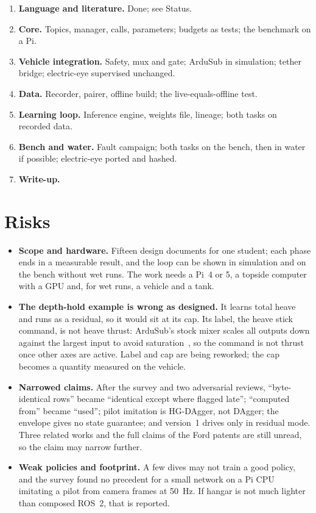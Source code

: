 \documentclass[conference]{IEEEtran}
\begin{document}
\begin{enumerate}
\item \textbf{Language and literature.} Done; see Status.
\item \textbf{Core.} Topics, manager, calls, parameters; budgets as tests;
  the benchmark on a Pi.
\item \textbf{Vehicle integration.} Safety, mux and gate; ArduSub in
  simulation; tether bridge; electric-eye supervised unchanged.
\item \textbf{Data.} Recorder, pairer, offline build; the
  live-equals-offline test.
\item \textbf{Learning loop.} Inference engine, weights file, lineage; both
  tasks on recorded data.
\item \textbf{Bench and water.} Fault campaign; both tasks on the bench,
  then in water if possible; electric-eye ported and hashed.
\item \textbf{Write-up.}
\end{enumerate}

\section{Risks}

\begin{itemize}
\item \textbf{Scope and hardware.} Fifteen design documents for one student;
  each phase ends in a measurable result, and the loop can be shown in
  simulation and on the bench without wet runs. The work needs a Pi~4 or 5, a
  topside computer with a GPU and, for wet runs, a vehicle and a tank.
\item \textbf{The depth-hold example is wrong as designed.} It learns total
  heave and runs as a residual, so it would sit at its cap. Its label, the
  heave stick command, is not heave thrust: ArduSub's stock mixer scales all
  outputs down against the largest input to avoid
  saturation~\cite{ng2024ardusub}, so the command is not thrust once other
  axes are active. Label and cap are being reworked; the cap becomes a
  quantity measured on the vehicle.
\item \textbf{Narrowed claims.} After the survey and two adversarial reviews,
  ``byte-identical rows'' became ``identical except where flagged late'';
  ``computed from'' became ``used''; pilot imitation is HG-DAgger, not DAgger;
  the envelope gives no state guarantee; and version~1 drives only in
  residual mode. Three related works and the full claims of the Ford patents
  are still unread, so the claim may narrow further.
\item \textbf{Weak policies and footprint.} A few dives may not train a good
  policy, and the survey found no precedent for a small network on a Pi CPU
  imitating a pilot from camera frames at 50~Hz. If hangar is not much
  lighter than composed ROS~2, that is reported.
\end{itemize}
\end{document}
